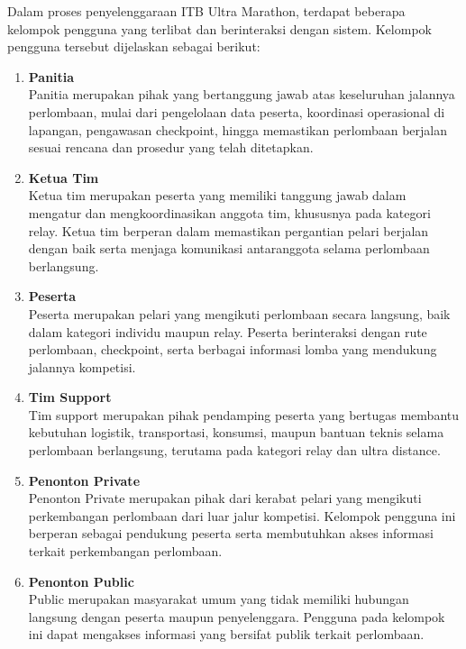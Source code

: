 Dalam proses penyelenggaraan ITB Ultra Marathon, terdapat beberapa kelompok pengguna yang terlibat dan berinteraksi dengan sistem. Kelompok pengguna tersebut dijelaskan sebagai berikut:

\begin{enumerate}
    \item \textbf{Panitia} \\
    Panitia merupakan pihak yang bertanggung jawab atas keseluruhan jalannya
    perlombaan, mulai dari pengelolaan data peserta, koordinasi operasional di
    lapangan, pengawasan checkpoint, hingga memastikan perlombaan berjalan
    sesuai rencana dan prosedur yang telah ditetapkan.

    \item \textbf{Ketua Tim} \\
    Ketua tim merupakan peserta yang memiliki tanggung jawab dalam mengatur dan
    mengkoordinasikan anggota tim, khususnya pada kategori relay. Ketua tim
    berperan dalam memastikan pergantian pelari berjalan dengan baik serta
    menjaga komunikasi antaranggota selama perlombaan berlangsung.

    \item \textbf{Peserta} \\
    Peserta merupakan pelari yang mengikuti perlombaan secara langsung, baik
    dalam kategori individu maupun relay. Peserta berinteraksi dengan rute
    perlombaan, checkpoint, serta berbagai informasi lomba yang mendukung
    jalannya kompetisi.

    \item \textbf{Tim Support} \\
    Tim support merupakan pihak pendamping peserta yang bertugas membantu
    kebutuhan logistik, transportasi, konsumsi, maupun bantuan teknis selama
    perlombaan berlangsung, terutama pada kategori relay dan ultra distance.

    \item \textbf{Penonton Private} \\
    Penonton Private merupakan pihak dari kerabat pelari yang mengikuti perkembangan
    perlombaan dari luar jalur kompetisi. Kelompok pengguna ini berperan
    sebagai pendukung peserta serta membutuhkan akses informasi terkait
    perkembangan perlombaan.

    \item \textbf{Penonton Public} \\
    Public merupakan masyarakat umum yang tidak memiliki hubungan langsung
    dengan peserta maupun penyelenggara. Pengguna pada kelompok ini dapat
    mengakses informasi yang bersifat publik terkait perlombaan.
\end{enumerate}

